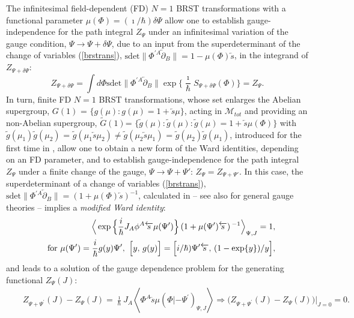 \documentclass[10pt]{article}
\begin{document}
The infinitesimal field-dependent (FD) $N=1$ BRST transformations with a functional parameter
$\mu(\Phi)= (\imath / \hbar) \delta \Psi $ allow one to establish gauge-independence
for the path integral $Z_\Psi$ under an infinitesimal variation of the gauge condition,
$\Psi \to \Psi+\delta\Psi$, due to an input from the superdeterminant of the change
of variables (\ref{brstrans}), $\mathrm{sdet}\|\Phi^{\prime A} \overleftarrow{\partial}_{B} \| = 1-\mu(\Phi)\overleftarrow{s} $,
in the integrand of $Z_{\Psi+\delta\Psi}$:
\begin{equation}\label{N1GI}
  Z_{\Psi+\delta\Psi} =  \int  d \Phi   \mathrm{sdet}\|\Phi^{\prime A} \overleftarrow{\partial}_{B} \| \exp \Big\{\frac{\imath}{\hbar}S_{\Psi+\delta\Psi}(\Phi)\Big\}=   Z_{\Psi}.
\end{equation}
In turn, finite FD $N=1$ BRST transformations, whose set enlarges the Abelian supergroup,
$G(1)$ = $\{g(\mu) : g(\mu)=1 + \overleftarrow{s}\mu\}$, acting in $\mathcal{M}_{tot}$
and providing an non-Abelian supergroup, $\widetilde{G}(1)$= $\{\tilde{g}(\mu): \tilde{g}(\mu)
: \tilde{g}(\mu)=1 + \overleftarrow{s}\mu(\Phi)\}$ with
$\tilde{g}(\mu_1)\tilde{g}(\mu_2)$ = $\tilde{g}(\mu_1\overleftarrow{s}\mu_2)\ne
\tilde{g}(\mu_2\overleftarrow{s}\mu_1)$ = $\tilde{g}(\mu_2)\tilde{g}(\mu_1)$,
introduced for the first time in \cite{sdj}, allow one to obtain a new form
of the Ward identities, depending on an FD parameter, and to establish gauge-independence
for the path integral $Z_\Psi$ under a finite change of the gauge,
$\Psi\to \Psi+\Psi'$: $Z_\Psi = Z_{\Psi+\Psi'}$. In this case, the superdeterminant
of a change of variables (\ref{brstrans}), $\mathrm{sdet}\|\Phi^{\prime A}
\overleftarrow{\partial}_{B} \| =  (1+\mu(\Phi)\overleftarrow{s})^{-1} $,
calculated in \cite{ll1}  -- see also \cite{re} for general gauge theories --
implies a \emph{modified Ward identity}:
\begin{eqnarray}
&& \Big\langle \exp\Big\{\frac{i}{%
\hbar }J_{A}\phi ^{A}
\overleftarrow{s}\mu (\Psi ^{\prime })\Big\} \left( 1+\mu (\Psi ^{\prime })\overleftarrow{s}\right) {}^{-1}%
\Big\rangle _{\Psi ,J} =1, \label{mWI} \\
&& \mathrm{for}%
\ \mu (\Psi ^{\prime })= \frac{i}{\hbar }g(y)\Psi ^{\prime } , \ \Big[y,\,g(y)\Big]=\Big[{%
i}/{\hbar })\Psi ^{\prime }\overleftarrow{s},\,(1-\exp \{y\})/y\Big],  \label{N1mWI}
\end{eqnarray}%
and leads to a solution of the gauge dependence problem for the generating
functional $Z_{\Psi}(J)$:
\begin{eqnarray}
&&Z_{\Psi+\Psi^{\prime }}(J)-Z_{\Psi}(J)=\frac{\imath}{
\hbar }J_{A}\textstyle\left\langle \Phi ^{A} \overleftarrow{s}\mu \left( \Phi |-{\Psi}%
^{\prime }\right) _{\Psi,J}\right\rangle  \Rightarrow \Big(Z_{\Psi+\Psi^{\prime }}(J)-Z_{\Psi}(J)\Big)\vert_{J=0}=0. \label{GDZN1}
\end{eqnarray}
\end{document}
